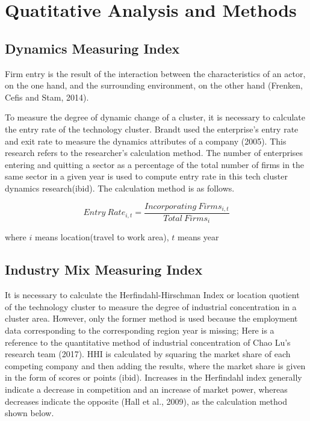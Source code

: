 \documentclass[
  12pt,
  oneside]{book}
\begin{document}
\hypertarget{quatitative-analysis-and-methods}{%
\section{Quatitative Analysis and Methods}\label{quatitative-analysis-and-methods}}

\hypertarget{dynamics-measuring-index}{%
\subsection{Dynamics Measuring Index}\label{dynamics-measuring-index}}

Firm entry is the result of the interaction between the
characteristics of an actor, on the one hand, and the surrounding environment, on the other hand (Frenken, Cefis and Stam, 2014).

To measure the degree of dynamic change of a cluster, it is necessary to calculate the entry rate of the technology cluster. Brandt used the enterprise's entry rate and exit rate to measure the dynamics attributes of a company (2005). This research refers to the researcher's calculation method. The number of enterprises entering and quitting a sector as a percentage of the total number of firms in the same sector in a given year is used to compute entry rate in this tech cluster dynamics research(ibid). The calculation method is as follows.

\[ 
Entry\ Rate_{i,t} = \frac{Incorporating\ Firms_{i,t}}{Total\  Firms_{i}} 
\]

where \(i\) means location(travel to work area), \(t\) means year

\hypertarget{industry-mix-measuring-index}{%
\subsection{Industry Mix Measuring Index}\label{industry-mix-measuring-index}}

It is necessary to calculate the Herfindahl-Hirschman Index or location quotient of the technology cluster to measure the degree of industrial concentration in a cluster area. However, only the former method is used because the employment data corresponding to the corresponding region year is missing; Here is a reference to the quantitative method of industrial concentration of Chao Lu's research team (2017). HHI is calculated by squaring the market share of each competing company and then adding the results, where the market share is given in the form of scores or points (ibid). Increases in the Herfindahl index generally indicate a decrease in competition and an increase of market power, whereas decreases indicate the opposite (Hall et al., 2009), as the calculation method shown below.
\end{document}
